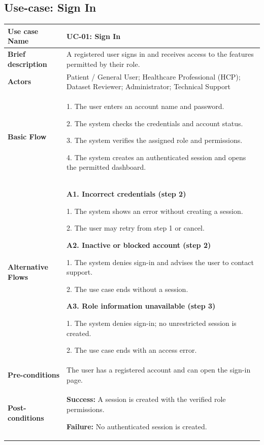 
\subsection{Use-case: Sign In}
\label{uc:uc-01}
\begin{longtable}{|p{}|p{}|}
\hline
\textbf{Use case Name} & UC-01: Sign In \\ \hline
\textbf{Brief description} & A registered user signs in and receives access to the features permitted by their role. \\ \hline
\textbf{Actors} & Patient / General User; Healthcare Professional (HCP); Dataset Reviewer; Administrator; Technical Support \\ \hline
\textbf{Basic Flow} &
1. The user enters an account name and password.\par
2. The system checks the credentials and account status.\par
3. The system verifies the assigned role and permissions.\par
4. The system creates an authenticated session and opens the permitted dashboard.
\\ \hline
\textbf{Alternative Flows} &
\textbf{A1. Incorrect credentials (step 2)}\par
1. The system shows an error without creating a session.\par
2. The user may retry from step 1 or cancel.
\par\smallskip
\textbf{A2. Inactive or blocked account (step 2)}\par
1. The system denies sign-in and advises the user to contact support.\par
2. The use case ends without a session.
\par\smallskip
\textbf{A3. Role information unavailable (step 3)}\par
1. The system denies sign-in; no unrestricted session is created.\par
2. The use case ends with an access error.
\\ \hline
\textbf{Pre-conditions} & The user has a registered account and can open the sign-in page. \\ \hline
\textbf{Post-conditions} & \textbf{Success:} A session is created with the verified role permissions.\par
\textbf{Failure:} No authenticated session is created. \\ \hline
\end{longtable}

